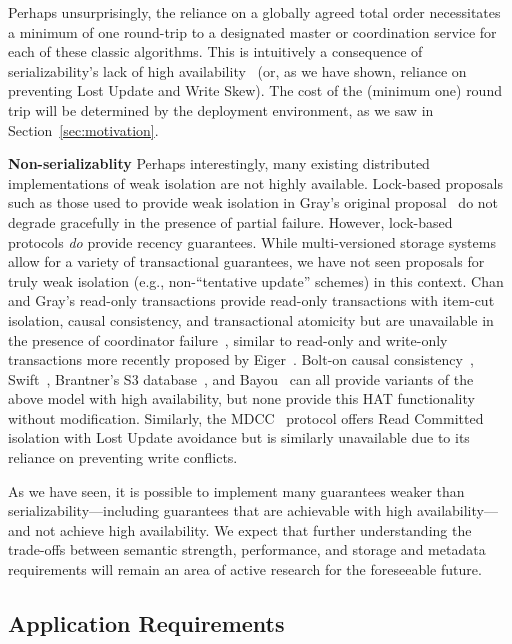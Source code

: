 Perhaps unsurprisingly, the reliance on a globally agreed total order
necessitates a minimum of one round-trip to a designated master or
coordination service for each of these classic algorithms.  This is
intuitively a consequence of serializability's lack of high
availability~\cite{davidson-survey} (or, as we have shown, reliance on
preventing Lost Update and Write Skew).  The cost of the (minimum one)
round trip will be determined by the deployment environment, as we saw
in Section~\ref{sec:motivation}.

\vspace{.5em}\noindent\textbf{Non-serializablity} Perhaps
interestingly, many existing distributed implementations of weak
isolation are not highly available. Lock-based proposals such as those
used to provide weak isolation in Gray's original
proposal~\cite{gray-isolation} do not degrade gracefully in the
presence of partial failure. However, lock-based protocols \textit{do}
provide recency guarantees. While multi-versioned storage systems
allow for a variety of transactional guarantees, we have not seen
proposals for truly weak isolation (e.g., non-``tentative update''
schemes) in this context. Chan and Gray's read-only transactions
provide read-only transactions with item-cut isolation, causal
consistency, and transactional atomicity but are unavailable in the
presence of coordinator failure~\cite{readonly}, similar to read-only
and write-only transactions more recently proposed by
Eiger~\cite{eiger}.  Bolt-on causal consistency~\cite{bolton},
Swift~\cite{swift}, Brantner's S3 database~\cite{kraska-s3}, and
Bayou~\cite{sessionguarantees} can all provide variants of the above
model with high availability, but none provide this HAT functionality
without modification. Similarly, the MDCC~\cite{mdcc} protocol offers
Read Committed isolation with Lost Update avoidance but is similarly
unavailable due to its reliance on preventing write conflicts.

As we have seen, it is possible to implement many guarantees weaker
than serializability---including guarantees that are achievable with
high availability---and not achieve high availability. We expect that
further understanding the trade-offs between semantic strength,
performance, and storage and metadata requirements will remain an area
of active research for the foreseeable future.

\subsection{Application Requirements}

